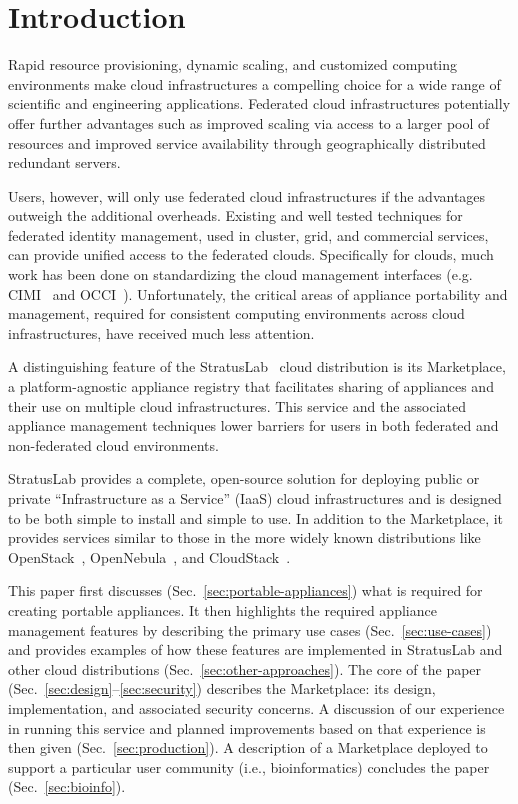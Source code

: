 \section{Introduction}
\label{sec:Introduction}

Rapid resource provisioning, dynamic scaling, and customized computing
environments make cloud infrastructures a compelling choice for a wide
range of scientific and engineering applications.  Federated cloud
infrastructures potentially offer further advantages such as improved
scaling via access to a larger pool of resources and improved service
availability through geographically distributed redundant servers.

Users, however, will only use federated cloud infrastructures if the
advantages outweigh the additional overheads.  Existing and well
tested techniques for federated identity management, used in cluster,
grid, and commercial services, can provide unified access to the
federated clouds.  Specifically for clouds, much work has been done on
standardizing the cloud management interfaces (e.g. CIMI~\cite{cimi}
and OCCI~\cite{occi}).  Unfortunately, the critical areas of appliance
portability and management, required for consistent computing
environments across cloud infrastructures, have received much less
attention.

A distinguishing feature of the StratusLab~\cite{slbook} cloud
distribution is its Marketplace, a platform-agnostic appliance
registry that facilitates sharing of appliances and their use on
multiple cloud infrastructures.  This service and the associated
appliance management techniques lower barriers for users in both
federated and non-federated cloud environments.

StratusLab provides a complete, open-source solution for deploying
public or private ``Infrastructure as a Service'' (IaaS) cloud
infrastructures and is designed to be both simple to install and
simple to use.  In addition to the Marketplace, it provides services
similar to those in the more widely known distributions like
OpenStack~\cite{openstack}, OpenNebula~\cite{one}, and
CloudStack~\cite{cloudstack}.

This paper first discusses (Sec.~\ref{sec:portable-appliances}) what
is required for creating portable appliances. It then highlights the
required appliance management features by describing the primary use
cases (Sec.~\ref{sec:use-cases}) and provides examples of how these
features are implemented in StratusLab and other cloud distributions
(Sec.~\ref{sec:other-approaches}).  The core of the paper
(Sec.~\ref{sec:design}--\ref{sec:security}) describes the Marketplace:
its design, implementation, and associated security concerns.  A
discussion of our experience in running this service and planned
improvements based on that experience is then given
(Sec.~\ref{sec:production}). A description of a Marketplace deployed
to support a particular user community (i.e., bioinformatics)
concludes the paper (Sec.~\ref{sec:bioinfo}).
